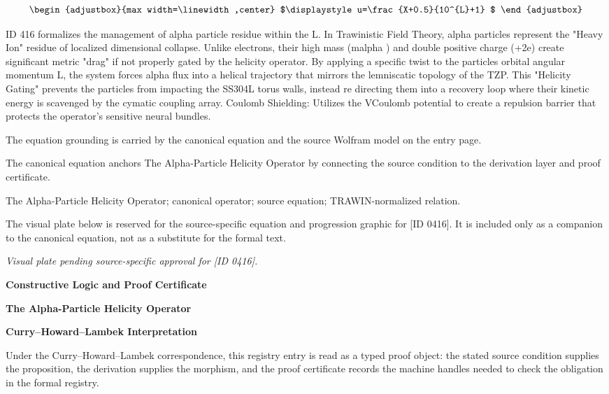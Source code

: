 \[
\begin{adjustbox}{max width=\linewidth,center}
$\displaystyle
u=\frac{X+0.5}{10^{L}+1}
$
\end{adjustbox}
\]

ID 416 formalizes the management of alpha particle residue within the L. In Trawinistic Field Theory, alpha particles represent the "Heavy Ion" residue of localized dimensional collapse. Unlike electrons, their high mass (malpha ) and double positive charge (+2e) create significant metric "drag" if not properly gated by the helicity operator. By applying a specific twist to the particles orbital angular momentum L, the system forces alpha flux into a helical trajectory that mirrors the lemniscatic topology of the TZP. This "Helicity Gating" prevents the particles from impacting the SS304L torus walls, instead re directing them into a recovery loop where their kinetic energy is scavenged by the cymatic coupling array. Coulomb Shielding: Utilizes the VCoulomb potential to create a repulsion barrier that protects the operator's sensitive neural bundles.

The equation grounding is carried by the canonical equation and the source Wolfram model on the entry page.

The canonical equation anchors The Alpha-Particle Helicity Operator by connecting the source condition to the derivation layer and proof certificate.

The Alpha-Particle Helicity Operator; canonical operator; source equation; TRAWIN-normalized relation.
\endgroup

\begingroup\footnotesize\sloppy
The visual plate below is reserved for the source-specific equation and progression graphic for [ID 0416]. It is included only as a companion to the canonical equation, not as a substitute for the formal text.
\par\endgroup
\begingroup\footnotesize\itshape
Visual plate pending source-specific approval for [ID 0416].
\par\endgroup

\clearpage
\begingroup\tzpsupportsetup
\noindent\textbf{\fontsize{10.8pt}{12.8pt}\selectfont [ID 0416] Constructive Logic and Proof Certificate}\par
\noindent\textbf{\fontsize{10pt}{12pt}\selectfont The Alpha-Particle Helicity Operator}\par
\vspace{0.45em}
\begingroup
\footnotesize
\setlength{\parskip}{0.22em}
\setlength{\parindent}{0pt}
\noindent\textbf{Curry--Howard--Lambek Interpretation}\par
Under the Curry--Howard--Lambek correspondence, this registry entry is read as a typed proof
object: the stated source condition supplies the proposition, the derivation supplies the
morphism, and the proof certificate records the machine handles needed to check the obligation
in the formal registry.

